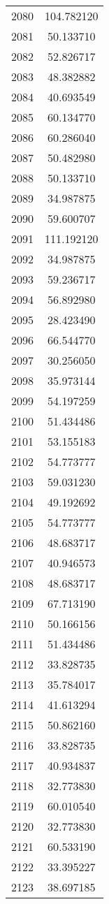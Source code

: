 \documentclass[12pt]{article}
\begin{document}
\begin{longtable}{@{}cc@{}}
2080 & 104.782120 \\
2081 & 50.133710 \\
2082 & 52.826717 \\
2083 & 48.382882 \\
2084 & 40.693549 \\
2085 & 60.134770 \\
2086 & 60.286040 \\
2087 & 50.482980 \\
2088 & 50.133710 \\
2089 & 34.987875 \\
2090 & 59.600707 \\
2091 & 111.192120 \\
2092 & 34.987875 \\
2093 & 59.236717 \\
2094 & 56.892980 \\
2095 & 28.423490 \\
2096 & 66.544770 \\
2097 & 30.256050 \\
2098 & 35.973144 \\
2099 & 54.197259 \\
2100 & 51.434486 \\
2101 & 53.155183 \\
2102 & 54.773777 \\
2103 & 59.031230 \\
2104 & 49.192692 \\
2105 & 54.773777 \\
2106 & 48.683717 \\
2107 & 40.946573 \\
2108 & 48.683717 \\
2109 & 67.713190 \\
2110 & 50.166156 \\
2111 & 51.434486 \\
2112 & 33.828735 \\
2113 & 35.784017 \\
2114 & 41.613294 \\
2115 & 50.862160 \\
2116 & 33.828735 \\
2117 & 40.934837 \\
2118 & 32.773830 \\
2119 & 60.010540 \\
2120 & 32.773830 \\
2121 & 60.533190 \\
2122 & 33.395227 \\
2123 & 38.697185 \\

\end{longtable}
\end{document}
